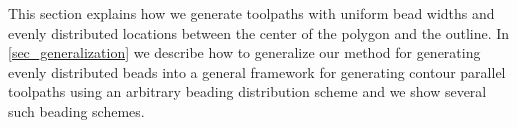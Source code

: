 This section explains how we generate toolpaths with uniform bead widths and evenly distributed locations between the center of the polygon and the outline.
In \cref{sec_generalization} we describe how to generalize our method for generating evenly distributed beads into a general framework for generating contour parallel toolpaths using an arbitrary beading distribution scheme and we show several such beading schemes.










